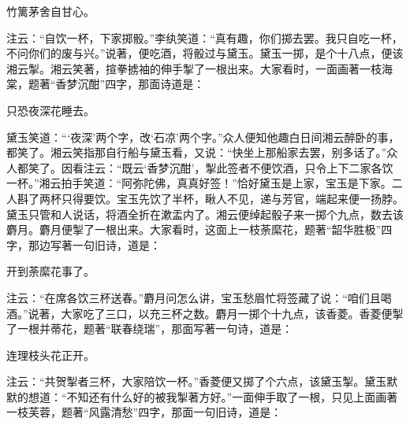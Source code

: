 \begin{poem}
    \begin{pl}竹篱茅舍自甘心。\end{pl}

\end{poem}


\begin{parag}
    注云：“自饮一杯，下家掷骰。”李纨笑道：“真有趣，你们掷去罢。我只自吃一杯，不问你们的废与兴。”说著，便吃酒，将骰过与黛玉。黛玉一掷，是个十八点，便该湘云掣。湘云笑著，揎拳掳袖的伸手掣了一根出来。大家看时，一面画著一枝海棠，题著“香梦沉酣”四字，那面诗道是：
\end{parag}


\begin{poem}
    \begin{pl}只恐夜深花睡去。
    \end{pl}
\end{poem}


\begin{parag}
    黛玉笑道：“‘夜深’两个字，改‘石凉’两个字。”众人便知他趣白日间湘云醉卧的事，都笑了。湘云笑指那自行船与黛玉看，又说：“快坐上那船家去罢，别多话了。”众人都笑了。因看注云：“既云‘香梦沉酣’，掣此签者不便饮酒，只令上下二家各饮一杯。”湘云拍手笑道：“阿弥陀佛，真真好签！”恰好黛玉是上家，宝玉是下家。二人斟了两杯只得要饮。宝玉先饮了半杯，瞅人不见，递与芳官，端起来便一扬脖。黛玉只管和人说话，将酒全折在漱盂内了。湘云便绰起骰子来一掷个九点，数去该麝月。麝月便掣了一根出来。大家看时，这面上一枝荼縻花，题著“韶华胜极”四字，那边写著一句旧诗，道是：
\end{parag}


\begin{poem}
    \begin{pl}开到荼縻花事了。
    \end{pl}
\end{poem}


\begin{parag}
    注云：“在席各饮三杯送春。”麝月问怎么讲，宝玉愁眉忙将签藏了说：“咱们且喝酒。”说著，大家吃了三口，以充三杯之数。麝月一掷个十九点，该香菱。香菱便掣了一根并蒂花，题著“联春绕瑞”，那面写著一句诗，道是：
\end{parag}


\begin{poem}
    \begin{pl}连理枝头花正开。
    \end{pl}
\end{poem}


\begin{parag}
    注云：“共贺掣者三杯，大家陪饮一杯。”香菱便又掷了个六点，该黛玉掣。黛玉默默的想道：“不知还有什么好的被我掣著方好。”一面伸手取了一根，只见上面画著一枝芙蓉，题著“风露清愁”四字，那面一句旧诗，道是：
\end{parag}


